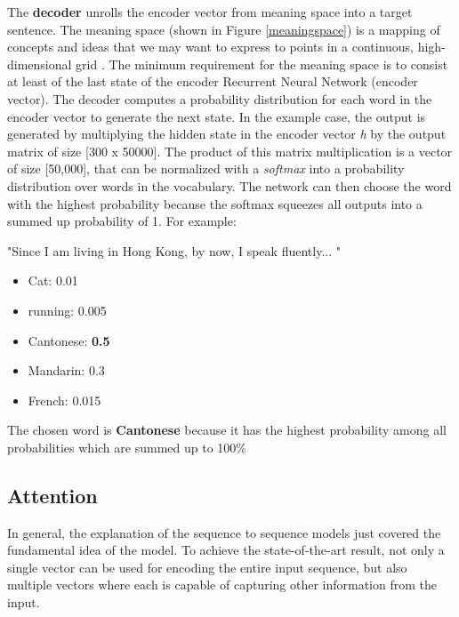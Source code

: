 The \textbf{ decoder} unrolls the encoder vector from meaning space into a target sentence. The meaning space (shown in Figure \ref{meaningspace}) is a mapping of concepts and ideas that we may want to express to points in a continuous, high-dimensional grid \cite{mugan}. 
The minimum requirement for the meaning space is to consist at least of the last state of the encoder Recurrent Neural Network (encoder vector). The decoder computes a probability distribution for each word in the encoder vector to generate the next state. In the example case, the output is generated by multiplying the hidden state in the encoder vector \textit{h} by the output matrix of size [300 x 50000]. The product of this matrix multiplication is a vector of size [50,000], that can be normalized with a \textit{softmax} into a probability distribution over words in the vocabulary. The network can then choose the word with the highest probability because the softmax squeezes all outputs into a summed up probability of 1. For example:

\begin{tcolorbox}
	"Since I am living in Hong Kong, by now, I speak fluently... "
	
	\begin{itemize}
		\item Cat: 0.01
		\item running: 0.005
		\item Cantonese: \textbf{0.5}
		\item Mandarin: 0.3
		\item French: 0.015
	\end{itemize}
	
	The chosen word is \textbf{Cantonese} because it has the highest probability among all probabilities which are summed up to 100\%
\end{tcolorbox}
 

\subsection{Attention}\label{ss:atten}
In general, the explanation of the sequence to sequence models just covered the fundamental idea of the model. To achieve the state-of-the-art result, not only a single vector can be used for encoding the entire input sequence, but also multiple vectors where each is capable of capturing other information from the input. 

